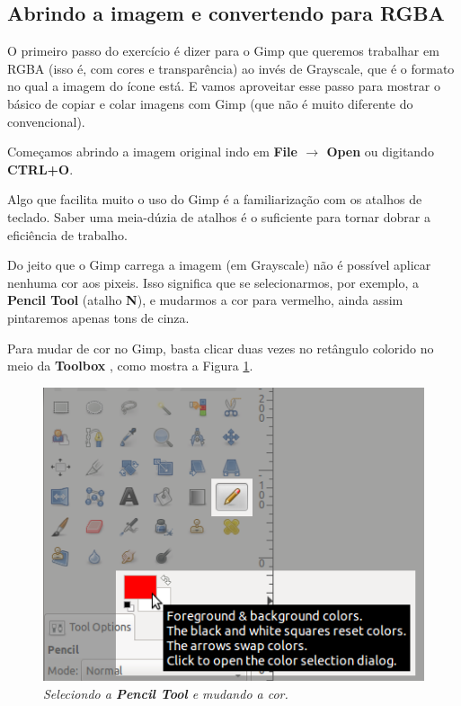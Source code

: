 \documentclass[12pt,onecolumn]{article}
\begin{document}
  \subsection{Abrindo a imagem e convertendo para RGBA}
    O primeiro passo do exercício é dizer para o Gimp que queremos trabalhar em
    RGBA (isso é, com cores e transparência) ao invés de Grayscale, que é o
    formato no qual a imagem do ícone está. E vamos aproveitar esse passo para
    mostrar o básico de copiar e colar imagens com Gimp (que não é muito
    diferente do convencional).
    
    Começamos abrindo a imagem original indo em {\bf File $\rightarrow$ Open}
    ou digitando {\bf CTRL+O}.
    
    \begin{framed}
      Algo que facilita muito o uso do Gimp é a familiarização com os atalhos
      de teclado. Saber uma meia-dúzia de atalhos é o suficiente para tornar
      dobrar a eficiência de trabalho. 
    \end{framed}
    
    Do jeito que o Gimp carrega a imagem (em Grayscale) não é possível aplicar
    nenhuma cor aos pixeis. Isso significa que se selecionarmos, por exemplo,
    a {\bf Pencil Tool} (atalho {\bf N}), e mudarmos a cor para vermelho, ainda
    assim pintaremos apenas tons de cinza.
    
    \begin{framed}
      Para mudar de cor no Gimp, basta clicar duas vezes no retângulo colorido
      no meio da {\bf Toolbox }, como mostra a Figura \ref{fig:pencil_and_color}.
    \end{framed}
    
    \begin{figure}[ht]
      \centering
      \includegraphics[width=.6\textwidth]{screenshots/00-pencil_and_color.png}
      \caption{
        \footnotesize
        \it
        Seleciondo a {\bf Pencil Tool} e mudando a cor.
      }
      \label{fig:pencil_and_color}
    \end{figure}
    
\end{document}
